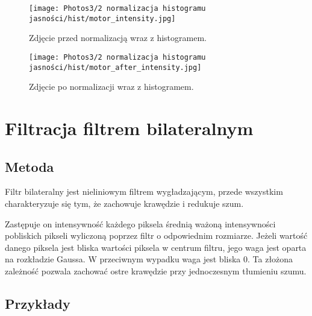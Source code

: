 \documentclass[]{mwart}
\begin{document}
\newpage

\begin{figure}[H]
    \centering
    \texttt{[image: Photos3/2 normalizacja histogramu jasności/hist/motor\_intensity.jpg]}
    \caption{Zdjęcie przed normalizacją wraz z histogramem.}
\end{figure}
\begin{figure}[H]
    \centering
    \texttt{[image: Photos3/2 normalizacja histogramu jasności/hist/motor\_after\_intensity.jpg]}
    \caption{Zdjęcie po normalizacji wraz z histogramem.}
\end{figure}




\vfill
\section{Filtracja filtrem bilateralnym         }
\subsection{Metoda}
Filtr bilateralny jest nieliniowym filtrem wygładzającym, przede wszystkim charakteryzuje się tym,
że zachowuje krawędzie i redukuje szum.

Zastępuje on intensywność każdego piksela średnią ważoną intensywności pobliskich pikseli
wyliczoną poprzez filtr o odpowiednim rozmiarze.
Jeżeli wartość danego piksela jest bliska wartości piksela w centrum filtru, jego waga jest 
oparta na rozkładzie Gaussa. W przeciwnym wypadku waga jest bliska 0.
Ta złożona zależność pozwala zachować ostre krawędzie przy jednoczesnym tłumieniu szumu. \newpage


\subsection{Przykłady}
\end{document}
